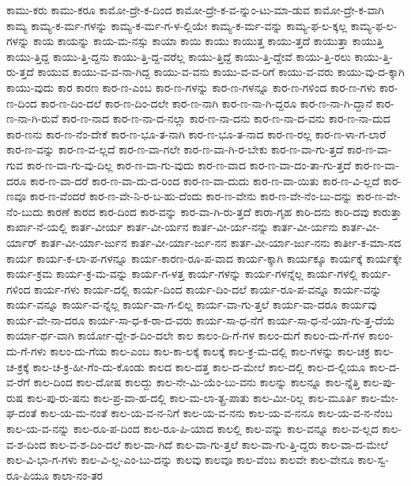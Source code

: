 {ಕಾಮು-ಕರು
ಕಾಮು-ಕರೂ
ಕಾಮೋ-ದ್ರೇ-ಕ-ದಿಂದ
ಕಾಮೋ-ದ್ರೇ-ಕ-ವ-ನ್ನುಂ-ಟು-ಮಾ-ಡುವ
ಕಾಮೋ-ದ್ರೇ-ಕ-ವಾಗಿ
ಕಾಮ್ಯ
ಕಾಮ್ಯ-ಕ-ರ್ಮ-ಗಳನ್ನು
ಕಾಮ್ಯ-ಕ-ರ್ಮ-ಗ-ಳ-ಲ್ಲಿಯೇ
ಕಾಮ್ಯ-ಕ-ರ್ಮ-ವನ್ನು
ಕಾಮ್ಯ-ಫ-ಲ-ಕ್ಕಲ್ಲ
ಕಾಮ್ಯ-ಫ-ಲ-ಗಳನ್ನು
ಕಾಯ
ಕಾಯನ್ನು
ಕಾಯ-ಮ-ನಸ್ಸು
ಕಾಯಾ
ಕಾಯಿ
ಕಾಯು
ಕಾಯುತ್ತ
ಕಾಯು-ತ್ತದೆ
ಕಾಯುತ್ತಾ
ಕಾಯುತ್ತಿ
ಕಾಯು-ತ್ತಿದ್ದ
ಕಾಯು-ತ್ತಿ-ದ್ದನು
ಕಾಯು-ತ್ತಿ-ದ್ದ-ವರೆಲ್ಲ
ಕಾಯು-ತ್ತಿದ್ದೆ
ಕಾಯು-ತ್ತಿ-ದ್ದೇವೆ
ಕಾಯು-ತ್ತಿ-ರಲು
ಕಾಯು-ತ್ತಿ-ರು-ತ್ತದೆ
ಕಾಯುವ
ಕಾಯು-ವ-ವ-ನಾ-ಗಿದ್ದ
ಕಾಯು-ವ-ವನು
ಕಾಯು-ವ-ವ-ರಿಗೆ
ಕಾಯು-ವ-ವರು
ಕಾಯು-ವು-ದ-ಕ್ಕಾಗಿ
ಕಾಯು-ವುದು
ಕಾರ
ಕಾರಣ
ಕಾರ-ಣ-ಎಂಬ
ಕಾರ-ಣ-ಗಳನ್ನು
ಕಾರ-ಣ-ಗಳನ್ನೂ
ಕಾರ-ಣ-ಗಳಿಂದ
ಕಾರ-ಣ-ಗಳು
ಕಾರ-ಣ-ದಿಂದ
ಕಾರ-ಣ-ದಿಂ-ದಲೆ
ಕಾರ-ಣ-ದಿಂ-ದಲೇ
ಕಾರ-ಣ-ನಾಗಿ
ಕಾರ-ಣ-ನಾ-ಗಿ-ದ್ದರೂ
ಕಾರ-ಣ-ನಾ-ಗಿ-ದ್ದಾನೆ
ಕಾರ-ಣ-ನಾ-ಗಿ-ರುವೆ
ಕಾರ-ಣ-ನಾದ
ಕಾರ-ಣ-ನಾ-ದ-ನಲ್ಲಾ
ಕಾರ-ಣ-ನಾ-ದನು
ಕಾರ-ಣ-ನಾ-ದ-ವನು
ಕಾರ-ಣ-ನಾ-ದುದ
ಕಾರ-ಣನು
ಕಾರ-ಣ-ನೆಂ-ದೇಕೆ
ಕಾರ-ಣ-ಭೂ-ತ-ನಾಗಿ
ಕಾರ-ಣ-ಭೂ-ತ-ನಾದ
ಕಾರ-ಣ-ರಲ್ಲ
ಕಾರ-ಣ-ಳಾ-ಗ-ಲಾರೆ
ಕಾರ-ಣ-ವನ್ನು
ಕಾರ-ಣ-ವ-ಲ್ಲದೆ
ಕಾರ-ಣ-ವಾ-ಗಲೇ
ಕಾರ-ಣ-ವಾ-ಗಿ-ರ-ಬೇಕು
ಕಾರ-ಣ-ವಾ-ಗು-ತ್ತದೆ
ಕಾರ-ಣ-ವಾ-ಗುವ
ಕಾರ-ಣ-ವಾ-ಗು-ವು-ದಿಲ್ಲ
ಕಾರ-ಣ-ವಾ-ಗು-ವುದು
ಕಾರ-ಣ-ವಾದ
ಕಾರ-ಣ-ವಾ-ದಂ-ತಾ-ಗು-ತ್ತದೆ
ಕಾರ-ಣ-ವಾ-ದರೂ
ಕಾರ-ಣ-ವಾ-ದರೆ
ಕಾರ-ಣ-ವಾ-ದು-ದ-ರಿಂದ
ಕಾರ-ಣ-ವಾ-ದುದು
ಕಾರ-ಣ-ವಾ-ಯಿತು
ಕಾರ-ಣ-ವಿ-ಲ್ಲದೆ
ಕಾರ-ಣವೂ
ಕಾರ-ಣ-ವೆಂದರೆ
ಕಾರ-ಣ-ವೇ-ನಿ-ರ-ಬ-ಹು-ದೆಂದು
ಕಾರ-ಣ-ವೇನು
ಕಾರ-ಣ-ವೇ-ನೆಂ-ಬು-ದನ್ನು
ಕಾರ-ಣ-ವೇ-ನೆಂ-ಬುದು
ಕಾರಣೆ
ಕಾರದ
ಕಾರ-ದಿಂದ
ಕಾರ-ವನ್ನು
ಕಾರ-ವಾ-ಗಿ-ರು-ತ್ತದೆ
ಕಾರಾ-ಗೃಹ
ಕಾರಿ-ದನು
ಕಾರಿ-ದವು
ಕಾರುತ್ತಾ
ಕಾರ್ಖಾ-ನೆ-ಯಲ್ಲಿ
ಕಾರ್ತ-ವೀರ್ಯ
ಕಾರ್ತ-ವೀ-ರ್ಯನ
ಕಾರ್ತ-ವೀ-ರ್ಯ-ನನ್ನು
ಕಾರ್ತ-ವೀ-ರ್ಯನು
ಕಾರ್ತ-ವೀ-ರ್ಯಾರ್
ಕಾರ್ತ-ವೀ-ರ್ಯಾ-ರ್ಜುನ
ಕಾರ್ತ-ವೀ-ರ್ಯಾ-ರ್ಜು-ನನ
ಕಾರ್ತ-ವೀ-ರ್ಯಾ-ರ್ಜು-ನನು
ಕಾರ್ತೀ-ಕ-ಮಾ-ಸದ
ಕಾರ್ಯ
ಕಾರ್ಯ-ಕ-ಲಾ-ಪ-ಗಳನ್ನೂ
ಕಾರ್ಯ-ಕಾರಣ-ರೂ-ಪ-ವಾದ
ಕಾರ್ಯ-ಕ್ಕಾಗಿ
ಕಾರ್ಯಕ್ಕೂ
ಕಾರ್ಯಕ್ಕೆ
ಕಾರ್ಯಕ್ಕೇ
ಕಾರ್ಯ-ಕ್ರಮ
ಕಾರ್ಯ-ಕ್ರ-ಮ-ವನ್ನು
ಕಾರ್ಯ-ಗ-ಳತ್ತ
ಕಾರ್ಯ-ಗಳನ್ನು
ಕಾರ್ಯ-ಗಳನ್ನೆಲ್ಲ
ಕಾರ್ಯ-ಗಳಲ್ಲಿ
ಕಾರ್ಯ-ಗಳಿಂದ
ಕಾರ್ಯ-ಗಳು
ಕಾರ್ಯ-ದಲ್ಲಿ
ಕಾರ್ಯ-ದಿಂದ
ಕಾರ್ಯ-ದಿಂ-ದಲೆ
ಕಾರ್ಯ-ರೂ-ಪ-ವನ್ನೂ
ಕಾರ್ಯ-ವನ್ನು
ಕಾರ್ಯ-ವನ್ನೂ
ಕಾರ್ಯ-ವ-ನ್ನೆಲ್ಲ
ಕಾರ್ಯ-ವಾ-ಗ-ಲಿಲ್ಲ
ಕಾರ್ಯ-ವಾ-ಗು-ತ್ತಲೆ
ಕಾರ್ಯ-ವಾ-ದರೂ
ಕಾರ್ಯವು
ಕಾರ್ಯ-ವೇ-ನಾ-ದರೂ
ಕಾರ್ಯ-ಸಾ-ಧ-ಕ-ರಾ-ದ-ವರು
ಕಾರ್ಯ-ಸಾ-ಧ-ನೆಗೆ
ಕಾರ್ಯ-ಸಾ-ಧ-ನೆ-ಯಾ-ಗು-ತ್ತ-ದೆಯೆ
ಕಾರ್ಯಾ-ರ್ಥ-ವಾಗಿ
ಕಾರ್ಯೋ-ದ್ದೇ-ಶ-ದಿಂ-ದಲೇ
ಕಾಲ
ಕಾಲಂ-ದಿ-ಗೆ-ಗಳ
ಕಾಲಂ-ದುಗೆ
ಕಾಲಂ-ದು-ಗೆ-ಗಳ
ಕಾಲಂ-ದು-ಗೆ-ಗಳು
ಕಾಲಂ-ದು-ಗೆಯ
ಕಾಲ-ಎಂಬ
ಕಾಲ-ಕಾ-ಲಕ್ಕೆ
ಕಾಲಕ್ಕೆ
ಕಾಲ-ಕ್ರ-ಮ-ದಲ್ಲಿ
ಕಾಲ-ಗಳನ್ನು
ಕಾಲ-ಚಕ್ರ
ಕಾಲ-ಚ-ಕ್ರಕ್ಕೆ
ಕಾಲ-ಚ-ಕ್ರ-ಹೀ-ಗೆಂ-ದು-ಕೊಂಡು
ಕಾಲದ
ಕಾಲ-ದತ್ತ
ಕಾಲ-ದ-ಮೇಲೆ
ಕಾಲ-ದಲ್ಲಿ
ಕಾಲ-ದ-ಲ್ಲಿಯೂ
ಕಾಲ-ದ-ವ-ರೆಗೆ
ಕಾಲ-ದಿಂದ
ಕಾಲ-ದೋಷ
ಕಾಲದ್ದು
ಕಾಲ-ನೇ-ಮಿ-ಯೆಂ-ಬು-ವನು
ಕಾಲನ್ನು
ಕಾಲನ್ನೂ
ಕಾಲ-ನ್ನೆತ್ತಿ
ಕಾಲ-ಪು-ರುಷ
ಕಾಲ-ಪು-ರು-ಷನು
ಕಾಲ-ಪ್ರ-ವಾ-ಹ-ದಲ್ಲಿ
ಕಾಲ-ಮ-ಲಾ-ತ್ಪ್ರ-ಪಾತು
ಕಾಲ-ಮೀ-ರಿಲ್ಲ
ಕಾಲ-ಮೂರ್ತಿ
ಕಾಲ-ಮೇ-ಘ-ದಂತೆ
ಕಾಲ-ಯ-ಮ-ನಂತೆ
ಕಾಲ-ಯ-ವ-ನ-ನಿಗೆ
ಕಾಲ-ಯ-ವ-ನನು
ಕಾಲ-ಯ-ವ-ನನೂ
ಕಾಲ-ಯ-ವ-ನ-ನೆಂಬ
ಕಾಲ-ಯ-ವ-ನನ್ನು
ಕಾಲ-ರೂ-ಪ-ದಿಂದ
ಕಾಲ-ರೂ-ಪಿ-ಯಾದ
ಕಾಲಲ್ಲಿ
ಕಾಲ-ವನ್ನು
ಕಾಲ-ವನ್ನೂ
ಕಾಲ-ವ-ಲ್ಲದ
ಕಾಲ-ವ-ಶ-ದಿಂದ
ಕಾಲ-ವ-ಶ-ದಿಂ-ದಲೆ
ಕಾಲ-ವಾ-ಗಿದೆ
ಕಾಲ-ವಾ-ಗು-ತ್ತಲೆ
ಕಾಲ-ವಾ-ಗು-ತ್ತಿ-ದ್ದರು
ಕಾಲ-ವಾ-ದ-ಮೇಲೆ
ಕಾಲ-ವಿ-ಭಾ-ಗ-ಗಳು
ಕಾಲ-ವಿ-ಲ್ಲ-ಎಂ-ಬು-ದನ್ನು
ಕಾಲವು
ಕಾಲವೂ
ಕಾಲ-ವೆಂಬ
ಕಾಲವೇ
ಕಾಲ-ವೇನೂ
ಕಾಲ-ಸ್ವ-ರೂ-ಪಿಯೂ
ಕಾಲಾ-ನಂ-ತರ
}
